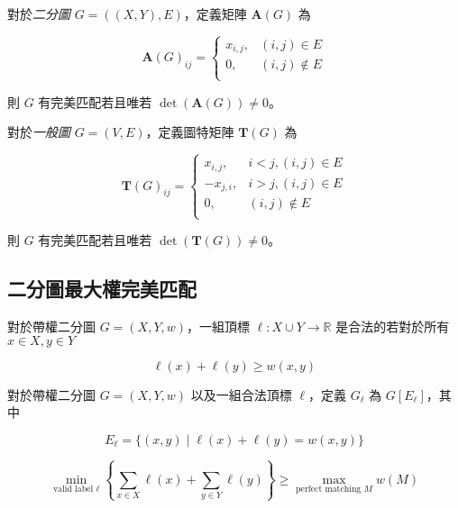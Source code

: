 \documentclass[standalone]{beamer}
\begin{document}
\begin{frame}{}
   {
    \begin{theorem}
      對於\emph{二分圖} $G = ((X, Y), E)$，定義矩陣 $\mathbf{A}(G)$ 為

      \[
        \mathbf{A}(G)_{ij} =
          \begin{cases}
            x_{i,j}, & (i, j) \in E \\
            0, & (i, j) \not\in E \\
          \end{cases}
      \]

      則 $G$ 有完美匹配若且唯若 $\operatorname{det}(\mathbf{A}(G)) \neq 0$。
    \end{theorem}
  }
   {
    \begin{theorem}
      對於\emph{一般圖} $G = (V, E)$，定義圖特矩陣 $\mathbf{T}(G)$ 為

      \[
        \mathbf{T}(G)_{ij} =
          \begin{cases}
            x_{i,j}, & i < j, (i, j) \in E \\
            -x_{j,i}, & i > j, (i, j) \in E \\
            0, & (i, j) \not\in E \\
          \end{cases}
      \]

      則 $G$ 有完美匹配若且唯若 $\operatorname{det}(\mathbf{T}(G)) \neq 0$。
    \end{theorem}
  }
\end{frame}

\subsection{二分圖最大權完美匹配}

\begin{frame}{}
   {
    \begin{definition}
      對於帶權二分圖 $G = (X, Y, w)$，一組頂標 $\ell: X \cup Y \to \mathbb{R}$ 是合法的若對於所有 $x \in X, y \in Y$

      \[ \ell(x) + \ell(y) \geq w(x, y) \]
    \end{definition}
  }
   {
     {
      \begin{definition}
        對於帶權二分圖 $G = (X, Y, w)$ 以及一組合法頂標 $\ell$，定義 $G_\ell$ 為 $G[E_\ell]$，其中

        \[ E_\ell = \{(x, y) \mid \ell(x) + \ell(y) = w(x, y) \} \]
      \end{definition}
    } {
      \[
        \min_{\text{valid label } \ell}\left\{\sum_{x \in X}\ell(x) + \sum_{y \in Y}\ell(y) \right\} \geq \max_{\text{perfect matching } M}w(M)
      \]
    }
  }
\end{frame}
\end{document}
